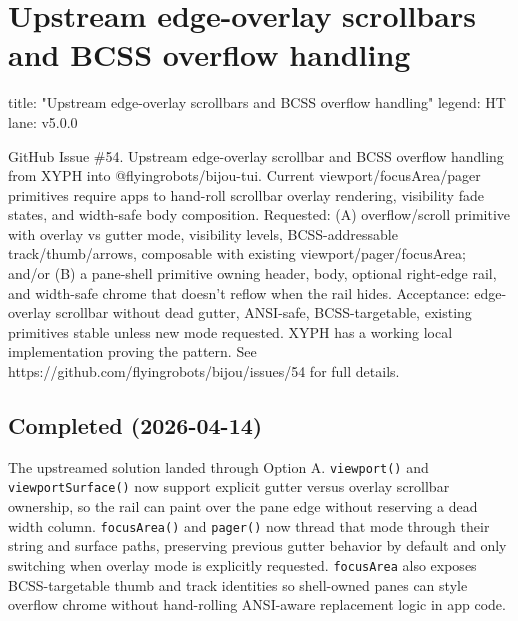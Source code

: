 \chapter{Upstream edge-overlay scrollbars and BCSS overflow handling}\label{record-354}

\smallskip

\begin{RecordMeta}
title: "Upstream edge-overlay scrollbars and BCSS overflow handling"
legend: HT
lane: v5.0.0

\end{RecordMeta}

GitHub Issue \#54. Upstream edge-overlay scrollbar and BCSS overflow handling from XYPH into @flyingrobots/bijou-tui. Current viewport/focusArea/pager primitives require apps to hand-roll scrollbar overlay rendering, visibility fade states, and width-safe body composition. Requested: (A) overflow/scroll primitive with overlay vs gutter mode, visibility levels, BCSS-addressable track/thumb/arrows, composable with existing viewport/pager/focusArea; and/or (B) a pane-shell primitive owning header, body, optional right-edge rail, and width-safe chrome that doesn't reflow when the rail hides. Acceptance: edge-overlay scrollbar without dead gutter, ANSI-safe, BCSS-targetable, existing primitives stable unless new mode requested. XYPH has a working local implementation proving the pattern. See https://github.com/flyingrobots/bijou/issues/54 for full details.

\section{Completed (2026-04-14)}\label{record-354-completed-2026-04-14}

The upstreamed solution landed through Option A. \texttt{v\allowbreak{}i\allowbreak{}e\allowbreak{}w\allowbreak{}p\allowbreak{}o\allowbreak{}r\allowbreak{}t\allowbreak{}(\allowbreak{})} and \texttt{v\allowbreak{}i\allowbreak{}e\allowbreak{}w\allowbreak{}p\allowbreak{}o\allowbreak{}r\allowbreak{}t\allowbreak{}S\allowbreak{}u\allowbreak{}r\allowbreak{}f\allowbreak{}a\allowbreak{}c\allowbreak{}e\allowbreak{}(\allowbreak{})} now support explicit gutter versus overlay scrollbar ownership, so the rail can paint over the pane edge without reserving a dead width column. \texttt{f\allowbreak{}o\allowbreak{}c\allowbreak{}u\allowbreak{}s\allowbreak{}A\allowbreak{}r\allowbreak{}e\allowbreak{}a\allowbreak{}(\allowbreak{})} and \texttt{p\allowbreak{}a\allowbreak{}g\allowbreak{}e\allowbreak{}r\allowbreak{}(\allowbreak{})} now thread that mode through their string and surface paths, preserving previous gutter behavior by default and only switching when overlay mode is explicitly requested. \texttt{f\allowbreak{}o\allowbreak{}c\allowbreak{}u\allowbreak{}s\allowbreak{}A\allowbreak{}r\allowbreak{}e\allowbreak{}a} also exposes BCSS-targetable thumb and track identities so shell-owned panes can style overflow chrome without hand-rolling ANSI-aware replacement logic in app code.


